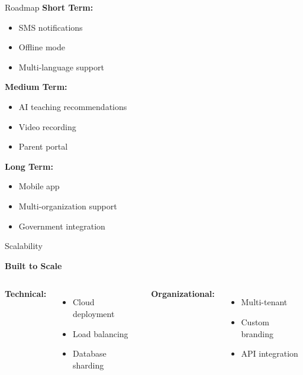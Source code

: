 \documentclass[aspectratio=169]{beamer}
\begin{document}
\begin{frame}{Roadmap}
    \textbf{Short Term:}
    \begin{itemize}
        \item SMS notifications
        \item Offline mode
        \item Multi-language support
    \end{itemize}
    
    \vspace{0.5em}
    
    \textbf{Medium Term:}
    \begin{itemize}
        \item AI teaching recommendations
        \item Video recording
        \item Parent portal
    \end{itemize}
    
    \vspace{0.5em}
    
    \textbf{Long Term:}
    \begin{itemize}
        \item Mobile app
        \item Multi-organization support
        \item Government integration
    \end{itemize}
\end{frame}

\begin{frame}{Scalability}
    \begin{center}
        \Large\textbf{Built to Scale}
    \end{center}
    
    \vspace{2em}
    
    \begin{columns}
        \textbf{Technical:}
        \begin{itemize}
            \item Cloud deployment
            \item Load balancing
            \item Database sharding
        \end{itemize}
        
        \textbf{Organizational:}
        \begin{itemize}
            \item Multi-tenant
            \item Custom branding
            \item API integration
        \end{itemize}
    \end{columns}
\end{frame}
\end{document}
